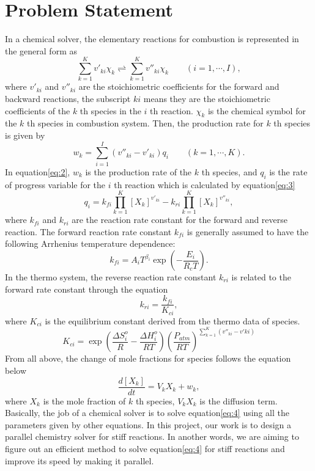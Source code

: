 \documentclass{article}
\begin{document}
\section{Problem Statement}
\qquad In a chemical solver, the elementary reactions for combustion is represented in the general form as
\begin{equation}
    \sum_{k=1}^Kv'_{ki}\chi_k\rightleftharpoons \sum_{k=1}^Kv''_{ki}\chi_k \qquad (i = 1, \cdots, I),
\end{equation}
where $v'_{ki}$ and $v''_{ki}$ are the stoichiometric coefficients for the forward and backward reactions,
 the subscript $ki$ means they are the stoichiometric coefficients of the $k$ th species in the $i$ th reaction.
 $\chi_k$ is the chemical symbol for the $k$ th species in combustion system.
Then, the production rate for $k$ th species is given by
\begin{equation}
    w_k = \sum_{i=1}^I (v''_{ki}-v'_{ki})q_i \qquad (k = 1, \cdots, K).
    \label{eq:2}
\end{equation}
In equation\eqref{eq:2}, $w_k$ is the production rate of the $k$ th species, 
and $q_i$ is the rate of progress variable for the $i$ th reaction which is calculated by equation\eqref{eq:3}
\begin{equation}
    q_i = k_{fi}\prod^K_{k=1}\left[X_k\right]^{v'_{ki}}-k_{ri}\prod^K_{k=1}\left[X_k\right]^{v''_{ki}},
    \label{eq:3}
\end{equation}
where $k_{fi}$ and $k_{ri}$ are the reaction rate constant for the forward and reverse reaction.
The forward reaction rate constant $k_{fi}$ is generally assumed to have the following Arrhenius temperature dependence:
\begin{equation}
    k_{fi} = A_iT^{\beta_i}\exp\left(-\frac{E_i}{R_cT}\right).
\end{equation}
In the thermo system, the reverse reaction rate constant $k_{ri}$ is related to the forward rate constant
through the equation
\begin{equation}
    k_{ri} = \frac{k_{fi}}{K_{ci}},
\end{equation}
where $K_{ci}$ is the equilibrium constant derived from the thermo data of species.
\begin{equation}
    K_{ci}= \exp\left(\frac{\Delta S_i^o}{R}-\frac{\Delta H_i^o}{RT}\right)\left(\frac{P_{atm}}{RT}\right)^{\sum_{k=1}^K(v''_{ki}-v'{ki})}
\end{equation}
From all above, the change of mole fractions for species follows the equation below 
\begin{equation}
    \frac{d[X_k]}{dt} = V_kX_k + w_k,
    \label{eq:4}
\end{equation}
where $X_k$ is the mole fraction of $k$ th species, $V_kX_k$ is the diffusion term.
Basically, the job of a chemical solver is to solve equation\eqref{eq:4} 
using all the parameters given by other equations.
In this project, our work is to design a parallel chemistry solver for stiff reactions.
 In another words, we are aiming to figure out an efficient method to solve equation\eqref{eq:4} for stiff reactions
 and improve its speed by making it parallel.
\end{document}
